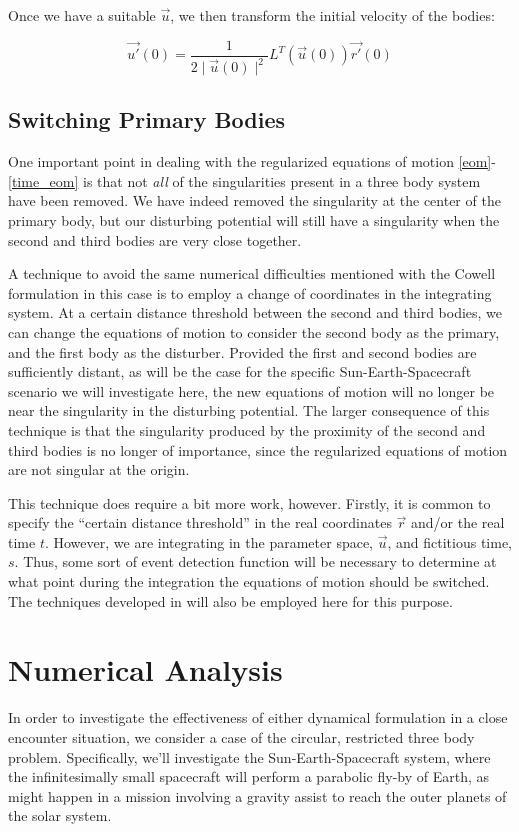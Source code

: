 \documentclass[11pt,twoside,letterpaper]{article}
\begin{document}
  Once we have a suitable \(\vec{u}\), we then transform the initial
  velocity of the bodies:

  \begin{equation} \label{initial_velocity}
    \vec{u'}(0) = \frac{1}{2\mid\vec{u}(0)\mid^2}L^T\left(\vec{u}(0)\right)\vec{r'}(0)
  \end{equation}
  
  
  \subsection{Switching Primary Bodies}
  One important point in dealing with the regularized equations of
  motion \ref{eom}-\ref{time_eom} is that not \textit{all} of the
  singularities present in a three body system have been removed. We
  have indeed removed the singularity at the center of the primary
  body, but our disturbing potential will still have a singularity
  when the second and third bodies are very close together.

  A technique to avoid the same numerical difficulties mentioned with
  the Cowell formulation in this case is to employ a change of
  coordinates in the integrating system. At a certain distance
  threshold between the second and third bodies, we can change the
  equations of motion to consider the second body as the primary, and
  the first body as the disturber. Provided the first and second
  bodies are sufficiently distant, as will be the case for the
  specific Sun-Earth-Spacecraft scenario we will investigate here, the
  new equations of motion will no longer be near the singularity in
  the disturbing potential. The larger consequence of this technique
  is that the singularity produced by the proximity of the second and
  third bodies is no longer of importance, since the regularized
  equations of motion are not singular at the origin.

  This technique does require a bit more work, however. Firstly, it is
  common to specify the ``certain distance threshold'' in the real
  coordinates \(\vec{r}\) and/or the real time \(t\). However, we are
  integrating in the parameter space, \(\vec{u}\), and fictitious
  time, \(s\). Thus, some sort of event detection function will be
  necessary to determine at what point during the integration the
  equations of motion should be switched. The techniques developed in
  \cite{amato_2017} will also be employed here for this purpose.

  \section{Numerical Analysis}
  In order to investigate the effectiveness of either dynamical
  formulation in a close encounter situation, we consider a case of
  the circular, restricted three body problem. Specifically, we'll
  investigate the Sun-Earth-Spacecraft system, where the
  infinitesimally small spacecraft will perform a parabolic fly-by of
  Earth, as might happen in a mission involving a gravity assist to
  reach the outer planets of the solar system.
\end{document}
